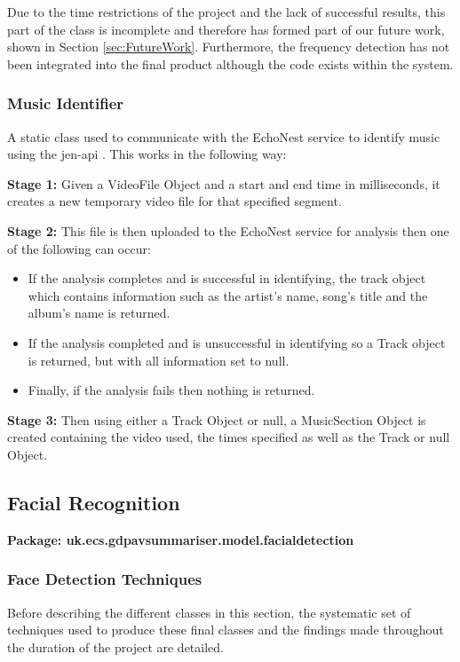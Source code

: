 Due to the time restrictions of the project and the lack of successful results, this part of the class is incomplete and therefore has formed part of 
our future work, shown in Section \ref{sec:FutureWork}. Furthermore, the frequency detection has not been integrated into the final product although the code exists within the system.

\subsubsection{Music Identifier}
\label{sec:Music}
A static class used to communicate with the EchoNest service \cite{citeEcho} to identify music using the jen-api \cite{jenAPI}. This works in the following way:

\textbf{Stage 1:} Given a VideoFile Object and a start and end time in milliseconds, it creates a new temporary video file for that specified segment.

\textbf{Stage 2:} This file is then uploaded to the EchoNest service for analysis then one of the following can occur:
\begin{itemize}
	\item{If the analysis completes and is successful in identifying, the track object which contains information such as the artist's name, song's title and the album's name is returned.}
	\item{If the analysis completed and is unsuccessful in identifying so a Track object is returned, but with all information set to null.}
	\item{Finally, if the analysis fails then nothing is returned.}
\end{itemize}
\textbf{Stage 3:} Then using either a Track Object or null, a MusicSection Object is created containing the video used, the times specified as well as the Track or null Object.

\newpage
\subsection{Facial Recognition}
\label{sec:FacialRecognition}

\textbf{Package: uk.ecs.gdpavsummariser.model.facialdetection}

\subsubsection{Face Detection Techniques}
Before describing the different classes in this section, the systematic set of techniques used to produce these final classes and the findings made throughout the duration of the project are detailed.

